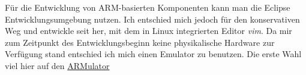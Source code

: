 F\"ur die Entwicklung von ARM-basierten Komponenten kann man die Eclipse Entwicklungsumgebung nutzen. Ich entschied mich jedoch f\"ur den konservativen Weg und entwickle seit her, mit dem in Linux integrierten Editor \textit{vim}. 
Da mir zum Zeitpunkt des Entwicklungsbeginn keine physikalische Hardware zur Verf\"ugung stand entschied ich mich einen Emulator zu benutzen. Die erste Wahl viel hier auf den 
\href{http://infocenter.arm.com/help/index.jsp?topic=/com.arm.doc.dai0032f/index.html}{ARMulator}